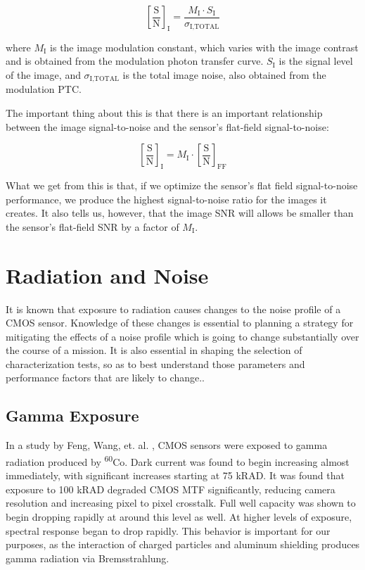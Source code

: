 \documentclass[10pt]{article}
\begin{document}
$$ \left [ \frac{\text{S}}{\text{N}} \right ] _{\text{I}}  = \frac{M_{\text{I}} \cdot S_{\text{I}}}{\sigma_{\text{I,TOTAL}}} $$

\noindent where $ M_{\text{I}}$ is the image modulation constant, which varies with the image contrast and is obtained from the modulation photon transfer curve. $ S_{\text{I}} $ is the signal level of the image, and $ \sigma_{\text{I,TOTAL}} $ is the total image noise, also obtained from the modulation PTC.

The important thing about this is that there is an important relationship between the image signal-to-noise and the sensor's flat-field signal-to-noise:

$$ \left [ \frac{\text{S}}{\text{N}} \right ] _{\text{I}}  = M_{\text{I}} \cdot \left [ \frac{\text{S}}{\text{N}} \right ]_{\text{FF}} $$

What we get from this is that, if we optimize the sensor's flat field signal-to-noise performance, we produce the highest signal-to-noise ratio for the images it creates. It also tells us, however, that  the image SNR will allows be smaller than the sensor's flat-field SNR by a factor of $ M_{\text{I}}$.

\section{Radiation and Noise}
\label{sec:RADeffects}

It is known that exposure to radiation causes changes to the noise profile of a CMOS sensor. Knowledge of these changes is essential to planning a strategy for mitigating the effects of a noise profile which is going to change substantially over the course of a mission. It is also essential in shaping the selection of characterization tests, so as to best understand those parameters and performance factors that are likely to change.. 

\subsection{Gamma Exposure} 

In a study by Feng, Wang, et. al. \cite{feng23}, CMOS sensors were exposed to gamma radiation produced by \textsuperscript{60}Co. Dark current was found to begin increasing almost immediately, with significant increases starting at 75 kRAD. It was found that exposure to 100 kRAD degraded CMOS MTF significantly, reducing camera resolution and increasing pixel to pixel crosstalk. Full well capacity was shown to begin dropping rapidly at around this level as well. At higher levels of exposure, spectral response began to drop rapidly. This behavior is important for our purposes, as the interaction of charged particles and aluminum shielding produces gamma radiation via Bremsstrahlung.
\end{document}
